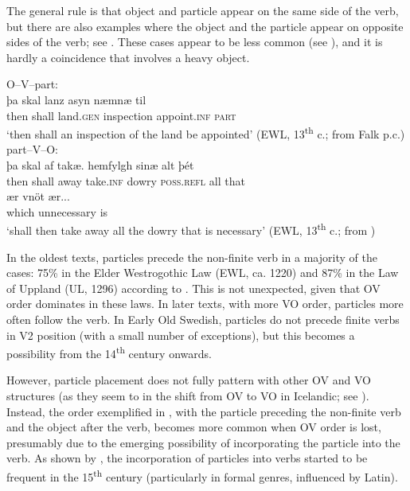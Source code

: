 \documentclass[output=paper]{langscibook}
\begin{document}
The general rule is that object and particle appear on the same side of the verb, but there are also examples where the object and the particle appear on opposite sides of the verb; see . These cases appear to be less common (see \citealt{Ljunggren1932}), and it is hardly a coincidence that  involves a heavy object.


\ea\label{ex:lalu:22}
\ea\label{ex:lalu:22a} O--V–part:  \\
\gll þa     skal   lanz       asyn       næmnæ       til\\
    then   shall   land.\textsc{gen}   inspection   appoint.\textsc{inf}   \textsc{part} \\
\glt `then shall an inspection of the land be appointed’ (EWL, 13\textsuperscript{th} c.; from Falk p.c.)\\

\ex \label{ex:lalu:22b}part–V–O:     \\
\gll þa     skal   af  takæ.   hemfylgh   sinæ       alt   þét \\
    then   shall   away  take.\textsc{inf}  dowry     \textsc{poss.refl}   all   that \\

\gll ær       vnöt         ær...\\
    which   unnecessary   is \\
\glt `shall then take away all the dowry that is necessary’ (EWL, 13\textsuperscript{th} c.; from \citealt{Ljunggren1932})\\
\z
\z



In the oldest texts, particles precede the non-finite verb in a majority of the cases: 75\% in the Elder Westrogothic Law (EWL, ca. 1220) and 87\% in the Law of Uppland (UL, 1296) according to \citet[95]{Ljunggren1932}. This is not unexpected, given that OV order dominates in these laws. In later texts, with more VO order, particles more often follow the verb. In Early Old Swedish, particles do not precede finite verbs in V2 position (with a small number of exceptions), but this becomes a possibility from the 14\textsuperscript{th} century onwards. 



However, particle placement does not fully pattern with other OV and VO structures (as they seem to in the shift from OV to VO in Icelandic; see \citealt{Hroarsdottir2008}). Instead, the order exemplified in , with the particle preceding the non-finite verb and the object after the verb, becomes more common when OV order is lost, presumably due to the emerging possibility of incorporating the particle into the verb. As shown by \citet{Ljunggren1932,Ljunggren1937}, the incorporation of particles into verbs started to be frequent in the 15\textsuperscript{th} century (particularly in formal genres, influenced by Latin).
\end{document}
